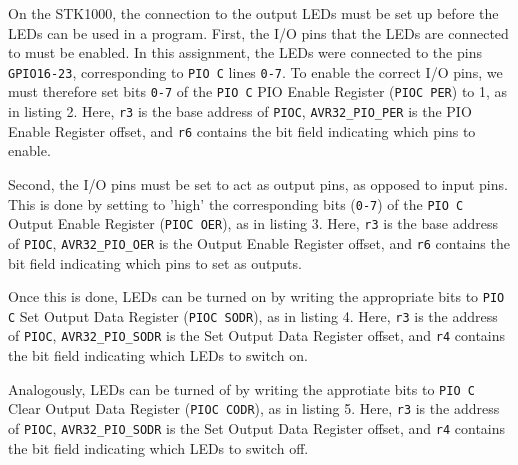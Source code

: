 On the STK1000, the connection to the output LEDs must be set up before the LEDs can be used in a program.
First, the I/O pins that the LEDs are connected to must be enabled.
In this assignment, the LEDs were connected to the pins \texttt{GPIO16-23}, corresponding to \texttt{PIO C} lines \texttt{0-7}.
To enable the correct I/O pins, we must therefore set bits \texttt{0-7} of the \texttt{PIO C} PIO Enable Register (\texttt{PIOC PER}) to 1, as in listing 2.
Here, \texttt{r3} is the base address of \texttt{PIOC}, \texttt{AVR32\_PIO\_PER} is the PIO Enable Register offset, and \texttt{r6} contains the bit field indicating which pins to enable.


Second, the I/O pins must be set to act as output pins, as opposed to input pins.
This is done by setting to 'high' the corresponding bits (\texttt{0-7}) of the \texttt{PIO C} Output Enable Register (\texttt{PIOC OER}), as in listing 3.
Here, \texttt{r3} is the base address of \texttt{PIOC}, \texttt{AVR32\_PIO\_OER} is the Output Enable Register offset, and \texttt{r6} contains the bit field indicating which pins to set as outputs.


Once this is done, LEDs can be turned on by writing the appropriate bits to \texttt{PIO C} Set Output Data Register (\texttt{PIOC SODR}), as in listing 4.
Here, \texttt{r3} is the address of \texttt{PIOC}, \texttt{AVR32\_PIO\_SODR} is the Set Output Data Register offset, and \texttt{r4} contains the bit field indicating which LEDs to switch on.


Analogously, LEDs can be turned of by writing the approtiate bits to \texttt{PIO C} Clear Output Data Register (\texttt{PIOC CODR}), as in listing 5. 
Here, \texttt{r3} is the address of \texttt{PIOC}, \texttt{AVR32\_PIO\_SODR} is the Set Output Data Register offset, and \texttt{r4} contains the bit field indicating which LEDs to switch off.

